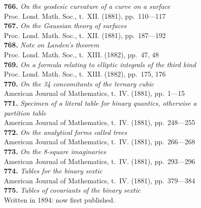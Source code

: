 \documentclass[12pt,a4paper,oneside]{book}
\theoremstyle{plain}
\theoremstyle{definition}
\theoremstyle{remark}
\begin{document}
\textbf{766.} \textit{On the geodesic curvature of a curve on a surface} \\
\hspace*{2em}Proc. Lond. Math. Soc., t.~XII. (1881), pp.~110---117\\[0.3em]
\textbf{767.} \textit{On the Gaussian theory of surfaces} \\
\hspace*{2em}Proc. Lond. Math. Soc., t.~XII. (1881), pp.~187---192\\[0.3em]
\textbf{768.} \textit{Note on Landen's theorem} \\
\hspace*{2em}Proc. Lond. Math. Soc., t.~XIII. (1882), pp.~47, 48\\[0.3em]
\textbf{769.} \textit{On a formula relating to elliptic integrals of the third kind} \\
\hspace*{2em}Proc. Lond. Math. Soc., t.~XIII. (1882), pp.~175, 176\\[0.3em]
\textbf{770.} \textit{On the 34 concomitants of the ternary cubic} \\
\hspace*{2em}American Journal of Mathematics, t.~IV. (1881), pp.~1---15\\[0.3em]
\textbf{771.} \textit{Specimen of a literal table for binary quantics, otherwise a}\\
\hspace*{2em}\textit{partition table} \\
\hspace*{2em}American Journal of Mathematics, t.~IV. (1881), pp.~248---255\\[0.3em]
\textbf{772.} \textit{On the analytical forms called trees} \\
\hspace*{2em}American Journal of Mathematics, t.~IV. (1881), pp.~266---268\\[0.3em]
\textbf{773.} \textit{On the 8-square imaginaries} \\
\hspace*{2em}American Journal of Mathematics, t.~IV. (1881), pp.~293---296\\[0.3em]
\textbf{774.} \textit{Tables for the binary sextic} \\
\hspace*{2em}American Journal of Mathematics, t.~IV. (1881), pp.~379---384\\[0.3em]
\textbf{775.} \textit{Tables of covariants of the binary sextic} \\
\hspace*{2em}Written in 1894: now first published.
\end{document}
